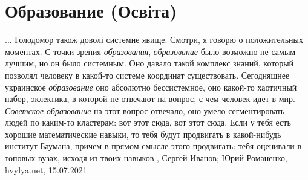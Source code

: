  
 
 
 
 
\chapter{Образование (Освіта)}

... Голодомор також доволі системне явище.  Смотри, я говорю о положительных
моментах. С точки зрения \emph{образования}, \emph{образование} было возможно не самым
лучшим, но он было системным. Оно давало такой комплекс знаний, который
позволял человеку в какой-то системе координат существовать. Сегодняшнее
украинское \emph{образование} оно абсолютно бессистемное, оно какой-то хаотичный
набор, эклектика, в которой не отвечают на вопрос, с чем человек идет в мир.
\emph{Советское образование} на этот вопрос отвечало, оно умело сегментировать людей
по каким-то кластерам: вот этот сюда, вот этот сюда. Если у тебя есть хорошие
математические навыки, то тебя будут продвигать в какой-нибудь институт
Баумана, причем в прямом смысле этого продвигать: тебя оценивали в топовых
вузах, исходя из твоих навыков
, 
Сергей Иванов; Юрий Романенко, hvylya.net, 15.07.2021
